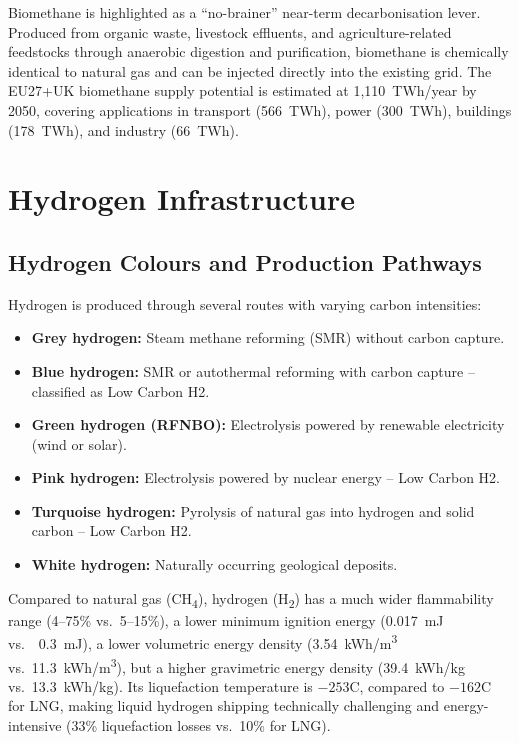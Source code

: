 Biomethane is highlighted as a ``no-brainer'' near-term decarbonisation lever. Produced from organic waste, livestock effluents, and agriculture-related feedstocks through anaerobic digestion and purification, biomethane is chemically identical to natural gas and can be injected directly into the existing grid. The EU27+UK biomethane supply potential is estimated at 1,110~TWh/year by 2050, covering applications in transport (566~TWh), power (300~TWh), buildings (178~TWh), and industry (66~TWh).

\section{Hydrogen Infrastructure}

\subsection{Hydrogen Colours and Production Pathways}

Hydrogen is produced through several routes with varying carbon intensities:
\begin{itemize}[noitemsep]
    \item \textbf{Grey hydrogen:} Steam methane reforming (SMR) without carbon capture.
    \item \textbf{Blue hydrogen:} SMR or autothermal reforming with carbon capture -- classified as Low Carbon H2.
    \item \textbf{Green hydrogen (RFNBO):} Electrolysis powered by renewable electricity (wind or solar).
    \item \textbf{Pink hydrogen:} Electrolysis powered by nuclear energy -- Low Carbon H2.
    \item \textbf{Turquoise hydrogen:} Pyrolysis of natural gas into hydrogen and solid carbon -- Low Carbon H2.
    \item \textbf{White hydrogen:} Naturally occurring geological deposits.
\end{itemize}

Compared to natural gas (CH\textsubscript{4}), hydrogen (H\textsubscript{2}) has a much wider flammability range (4--75\% vs.\ 5--15\%), a lower minimum ignition energy (0.017~mJ vs.\ ~0.3~mJ), a lower volumetric energy density (3.54~kWh/m\textsuperscript{3} vs.\ 11.3~kWh/m\textsuperscript{3}), but a higher gravimetric energy density (39.4~kWh/kg vs.\ 13.3~kWh/kg). Its liquefaction temperature is $-253$\textdegree C, compared to $-162$\textdegree C for LNG, making liquid hydrogen shipping technically challenging and energy-intensive (33\% liquefaction losses vs.\ 10\% for LNG).

